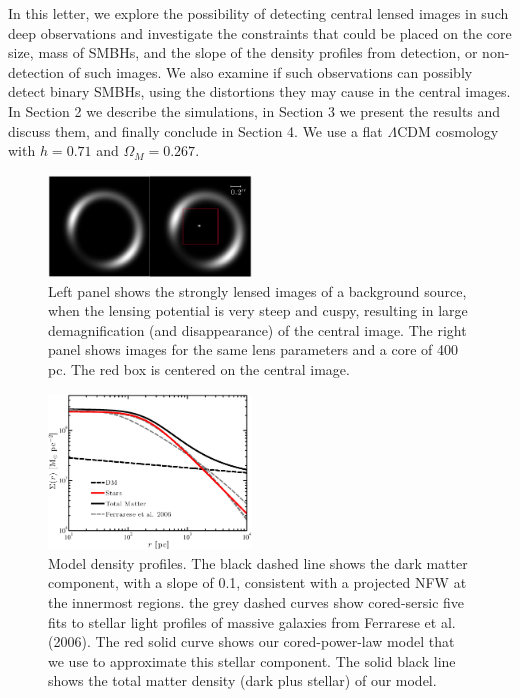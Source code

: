 \documentclass[chicago]{emulateapj}
\begin{document}
 In this letter, we explore the possibility of detecting central lensed images in such deep observations and investigate the constraints that could be placed on the core size, mass of SMBHs, and the slope of the density profiles from detection, or non-detection of such images. We also examine if 
 such observations can possibly detect binary SMBHs, using the distortions they may cause in the central images. 
 In Section 2 we describe the simulations, in Section 3 we present the results and discuss them, and finally conclude in Section 4. We use a flat $\Lambda$CDM cosmology with $h=0.71$ and $\Omega_M=0.267$.
 

\begin{figure}
\begin{center}
\centering
\includegraphics[trim= 10 0 0 0, clip, width=0.48\textwidth]{figures/f_02.eps}
\centering
\end{center}
\caption{ Left panel shows the strongly lensed images of a background source, when the lensing potential is very steep and cuspy, resulting in large demagnification (and disappearance) of the central image.  The right panel shows images for the same lens parameters and a core of 400 pc. The red box is centered on the  central image.
\label{fig1}}
\end{figure}

\begin{figure}
\begin{center}
\centering
\includegraphics[trim= 0 0 5 6, clip, width=0.48\textwidth]{figures/f_01.eps}
\centering
\end{center}
\vspace{-1mm}
\caption{ Model density profiles. The black dashed line shows the dark matter component, with a slope of 0.1, consistent with a projected NFW at the innermost regions. the grey dashed curves show cored-sersic five fits to stellar light profiles of massive galaxies from Ferrarese et al. (2006). The red solid curve shows our cored-power-law model that we use to approximate this stellar component. The solid black line shows the total matter density (dark plus stellar) of our model. 
\label{fig2}}
\vspace{-1.5mm}
\end{figure}
\end{document}
